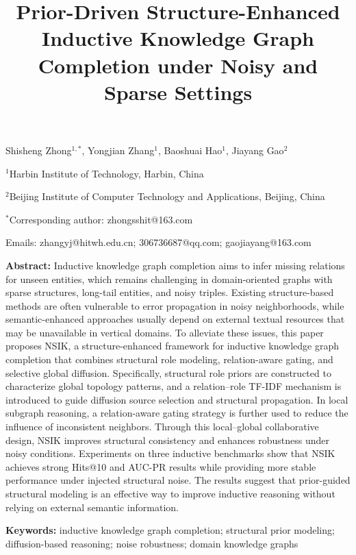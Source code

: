 \documentclass[preprint,12pt]{elsarticle}
\title{\textbf{Prior-Driven Structure-Enhanced Inductive Knowledge Graph Completion under Noisy and Sparse Settings}}
\author{}
\date{}
\begin{document}
\maketitle

\begin{center}
Shisheng Zhong$^{1,*}$, Yongjian Zhang$^{1}$, Baoshuai Hao$^{1}$, Jiayang Gao$^{2}$

$^{1}$Harbin Institute of Technology, Harbin, China

$^{2}$Beijing Institute of Computer Technology and Applications, Beijing, China

$^{*}$Corresponding author: zhongsshit@163.com

Emails: zhangyj@hitwh.edu.cn; 306736687@qq.com; gaojiayang@163.com
\end{center}

\vspace{1em}

 
\textbf{Abstract:} 
Inductive knowledge graph completion aims to infer missing relations for unseen entities, which remains challenging in domain-oriented graphs with sparse structures, long-tail entities, and noisy triples. Existing structure-based methods are often vulnerable to error propagation in noisy neighborhoods, while semantic-enhanced approaches usually depend on external textual resources that may be unavailable in vertical domains. 
To alleviate these issues, this paper proposes NSIK, a structure-enhanced framework for inductive knowledge graph completion that combines structural role modeling, relation-aware gating, and selective global diffusion. Specifically, structural role priors are constructed to characterize global topology patterns, and a relation--role TF-IDF mechanism is introduced to guide diffusion source selection and structural propagation. In local subgraph reasoning, a relation-aware gating strategy is further used to reduce the influence of inconsistent neighbors. Through this local--global collaborative design, NSIK improves structural consistency and enhances robustness under noisy conditions.
Experiments on three inductive benchmarks show that NSIK achieves strong Hits@10 and AUC-PR results while providing more stable performance under injected structural noise. The results suggest that prior-guided structural modeling is an effective way to improve inductive reasoning without relying on external semantic information.

\textbf{Keywords:} inductive knowledge graph completion; structural prior modeling; diffusion-based reasoning; noise robustness; domain knowledge graphs
\end{document}
